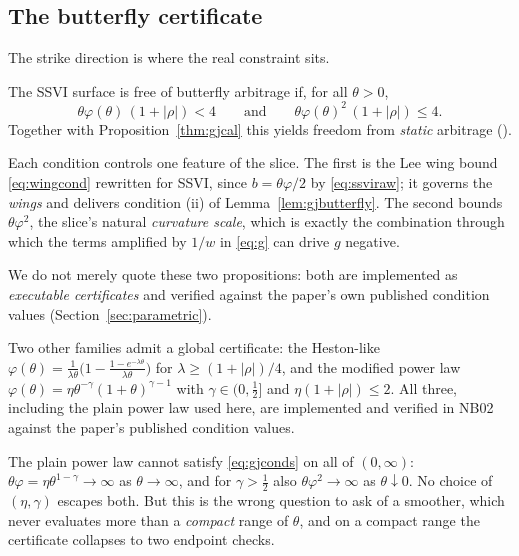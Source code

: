 \subsection{The butterfly certificate}

The strike direction is where the real constraint sits.

\begin{proposition}\label{thm:gjbfly}
The SSVI surface is free of butterfly arbitrage if, for all $\theta>0$,
\begin{equation}\label{eq:gjconds}
\theta\varphi(\theta)\,(1+|\rho|)<4
\qquad\text{and}\qquad
\theta\varphi(\theta)^{2}\,(1+|\rho|)\le4 .
\end{equation}
Together with Proposition~\ref{thm:gjcal} this yields freedom from \emph{static} arbitrage
(\cite[Cor.~4.1]{gatheraljacquier2014}).
\end{proposition}


Each condition controls one feature of the slice. The first is the Lee wing bound
\eqref{eq:wingcond} rewritten for SSVI, since $b=\theta\varphi/2$ by \eqref{eq:ssviraw}; it
governs the \emph{wings} and delivers condition (ii) of Lemma~\ref{lem:gjbutterfly}. The second
bounds $\theta\varphi^2$, the slice's natural \emph{curvature scale}, which is exactly the
combination through which the terms amplified by $1/w$ in \eqref{eq:g} can drive $g$ negative.

We do not merely quote these two propositions: both are implemented as \emph{executable
certificates} and verified against the paper's own published condition values
(Section~\ref{sec:parametric}).

\begin{example}\label{ex:phifamilies}
Two other families admit a global certificate: the Heston-like
$\varphi(\theta)=\frac{1}{\lambda\theta}\bigl(1-\frac{1-e^{-\lambda\theta}}{\lambda\theta}\bigr)$
for $\lambda\ge(1+|\rho|)/4$, and the modified power law
$\varphi(\theta)=\eta\theta^{-\gamma}(1+\theta)^{\gamma-1}$ with $\gamma\in(0,\tfrac12]$ and
$\eta(1+|\rho|)\le2$. All three, including the plain power law used here, are implemented and
verified in NB02 against the paper's published condition values.
\end{example}

\begin{remark}\label{rem:gj44}
The plain power law cannot satisfy \eqref{eq:gjconds} on all of $(0,\infty)$:
$\theta\varphi=\eta\theta^{1-\gamma}\to\infty$ as $\theta\to\infty$, and for $\gamma>\tfrac12$
also $\theta\varphi^2\to\infty$ as $\theta\downarrow0$. No choice of $(\eta,\gamma)$ escapes
both. But this is the wrong question to ask of a smoother, which never evaluates more than a
\emph{compact} range of $\theta$, and on a compact range the certificate collapses to two
endpoint checks.
\end{remark}

